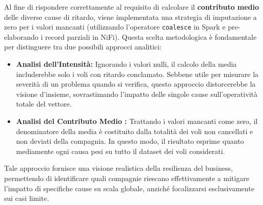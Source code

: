 \documentclass[conference]{IEEEtran}
\begin{document}
Al fine di rispondere correttamente al requisito di calcolare il \textbf{contributo medio} delle diverse cause di ritardo, viene implementata una strategia di imputazione a zero per i valori mancanti (utilizzando l'operatore \texttt{coalesce} in Spark e pre-elaborando i record parziali in NiFi).
Questa scelta metodologica è fondamentale per distinguere tra due possibili approcci analitici:
\begin{itemize}
    \item \textbf{Analisi dell'Intensità:} Ignorando i valori nulli, il calcolo della media includerebbe solo i voli con ritardo conclamato.
    Sebbene utile per misurare la severità di un problema quando si verifica, questo approccio distorcerebbe la visione d'insieme, sovrastimando l'impatto delle singole cause sull'operatività totale del vettore.
    \item \textbf{Analisi del Contributo Medio :} Trattando i valori mancanti come zero, il denominatore della media è costituito dalla totalità dei voli non cancellati e non deviati della compagnia.
    In questo modo, il risultato esprime quanto mediamente ogni causa pesi su tutto il dataset dei voli considerati.
\end{itemize}

Tale approccio fornisce una visione realistica della resilienza del business, permettendo di identificare quali compagnie riescano effettivamente a mitigare l'impatto di specifiche cause su scala globale, anziché focalizzarsi esclusivamente sui casi limite.
\end{document}
